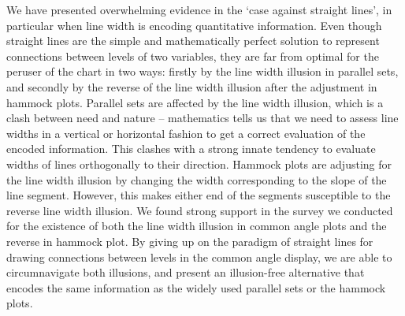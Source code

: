 We have presented overwhelming evidence in the `case against straight lines', in particular when line width is encoding quantitative information. Even though straight lines are the simple and mathematically perfect solution to represent  connections  between levels of two variables, they are far from optimal for the peruser of the chart in two ways: firstly by the line width illusion in parallel sets, and secondly by the reverse of the line width illusion after the adjustment in hammock plots.   Parallel sets are affected by the line width illusion, which is a clash between need and nature -- mathematics tells us that we  need to assess line widths in a vertical or horizontal fashion to get a correct evaluation of the encoded information. This clashes with a strong innate tendency to evaluate  widths of lines orthogonally to their  direction. Hammock plots are adjusting for the line width illusion by changing the  width corresponding to the slope of the line segment. However, this makes either end of the segments susceptible to the reverse line width illusion. We found strong support in the survey we conducted for the existence of both the line width illusion in common angle plots and the reverse in hammock plot. By giving up on the paradigm of straight lines for drawing connections between levels in the common angle display, we are able to circumnavigate both illusions, and present an illusion-free alternative that encodes the same information as the widely used parallel sets  or the hammock plots.



%
\appendix
%


